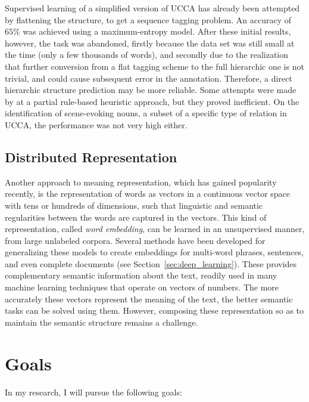 \documentclass[11pt]{article}
\newcommand{\secref}[1]{Section~\ref{#1}}
\begin{document}
Supervised learning of a simplified version of UCCA has already been attempted by
flattening the structure, to get a sequence tagging
problem\cite{beka2013thesis}. An accuracy of $65\%$ was achieved using a
maximum-entropy model. After these initial results, however, the task was
abandoned, firstly because the data set was still small at the time (only a few
thousands of words), and secondly due to the realization that further
conversion from a flat tagging scheme to the full hierarchic one is not
trivial, and could cause subsequent error in the annotation. Therefore, a
direct hierarchic structure prediction may be more reliable. Some attempts were
made by \cite{beka2013thesis} at a partial rule-based heuristic approach, but they proved inefficient.
On the identification of scene-evoking nouns, a subset of a specific type of
relation in UCCA, the performance was not very high either.

\subsection{Distributed Representation}\label{sec:distributed}

Another approach to meaning representation, which has gained popularity recently, is the
representation of words as vectors in a continuous vector space with tens or
hundreds of dimensions\cite{turian2010word}, such that linguistic and semantic
regularities between the words are captured in the
vectors\cite{mikolov2013linguistic}. This kind of representation, called
\textit{word embedding}, can be learned in an unsupervised manner, from large
unlabeled corpora.
Several methods have been developed for generalizing these models to create embeddings
for multi-word phrases, sentences, and even complete documents (see \secref{sec:deep_learning}).
These provides complementary semantic information about the text,
readily used in many machine learning techniques that operate on vectors of numbers.
The more accurately these vectors represent the meaning of the text, the better semantic tasks
can be solved using them.
However, composing these representation so as to maintain the semantic structure remains a challenge.



\section{Goals}\label{sec:goals}

In my research, I will pursue the following goals:
\end{document}

